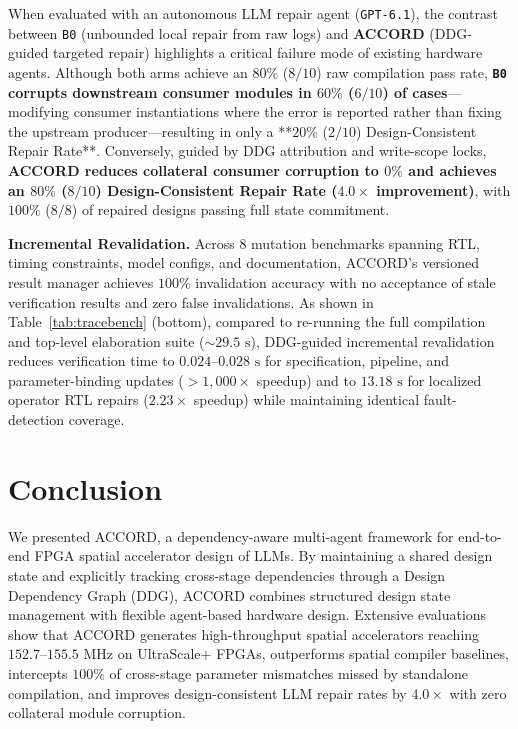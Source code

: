 \documentclass[9pt,conference]{IEEEtran}
\begin{document}
When evaluated with an autonomous LLM repair agent (\texttt{GPT-6.1}), the contrast between \texttt{B0} (unbounded local repair from raw logs) and \textbf{ACCORD} (DDG-guided targeted repair) highlights a critical failure mode of existing hardware agents. Although both arms achieve an $80\%$ ($8/10$) raw compilation pass rate, \textbf{\texttt{B0} corrupts downstream consumer modules in $60\%$ ($6/10$) of cases}—modifying consumer instantiations where the error is reported rather than fixing the upstream producer—resulting in only a **$20\%$ ($2/10$) Design-Consistent Repair Rate**. Conversely, guided by DDG attribution and write-scope locks, \textbf{ACCORD reduces collateral consumer corruption to $0\%$ and achieves an $80\%$ ($8/10$) Design-Consistent Repair Rate ($4.0\times$ improvement)}, with $100\%$ ($8/8$) of repaired designs passing full state commitment.

\textbf{Incremental Revalidation.}
Across $8$ mutation benchmarks spanning RTL, timing constraints, model configs, and documentation, ACCORD's versioned result manager achieves $100\%$ invalidation accuracy with no acceptance of stale verification results and zero false invalidations. As shown in Table~\ref{tab:tracebench} (bottom), compared to re-running the full compilation and top-level elaboration suite ($\sim 29.5\text{ s}$), DDG-guided incremental revalidation reduces verification time to $0.024\text{--}0.028\text{ s}$ for specification, pipeline, and parameter-binding updates ($>1,000\times$ speedup) and to $13.18\text{ s}$ for localized operator RTL repairs ($2.23\times$ speedup) while maintaining identical fault-detection coverage.

\section{Conclusion}
We presented ACCORD, a dependency-aware multi-agent framework for end-to-end FPGA spatial accelerator design of LLMs. By maintaining a shared design state and explicitly tracking cross-stage dependencies through a Design Dependency Graph (DDG), ACCORD combines structured design state management with flexible agent-based hardware design. Extensive evaluations show that ACCORD generates high-throughput spatial accelerators reaching $152.7\text{--}155.5\text{ MHz}$ on UltraScale+ FPGAs, outperforms spatial compiler baselines, intercepts $100\%$ of cross-stage parameter mismatches missed by standalone compilation, and improves design-consistent LLM repair rates by $4.0\times$ with zero collateral module corruption.



\vspace{12pt}
\clearpage
 
 
\end{document}
